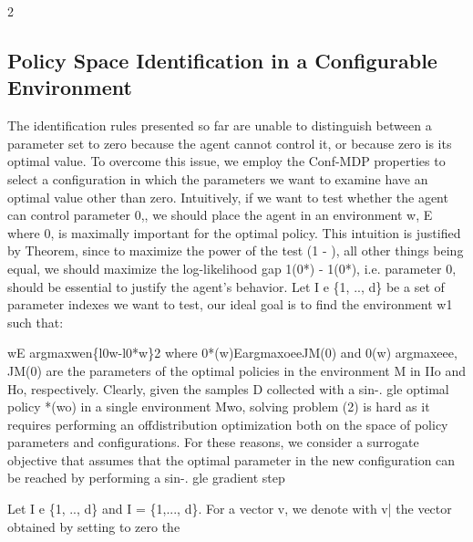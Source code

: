 \documentclass{article}
\begin{document}
\begin{paracol}{2}
\subsection*{Policy Space Identification in a Configurable
Environment}


The identification rules presented so far are unable to distinguish between a parameter set to zero because the agent
cannot control it, or because zero is its optimal value. To
overcome this issue, we employ the Conf-MDP properties
to select a configuration in which the parameters we want to
examine have an optimal value other than zero. Intuitively, if
we want to test whether the agent can control parameter 0,,
we should place the agent in an environment w, E  where
0, is maximally important for the optimal policy. This intuition is justified by Theorem, since to maximize the power
of the test (1 - ), all other things being equal, we should
maximize the log-likelihood gap 1(0*) - 1(0*), i.e. parameter 0, should be essential to justify the agent's behavior. Let
I e \{1, .., d\} be a set of parameter indexes we want to test,
our ideal goal is to find the environment w1 such that:


wE argmaxwen\{l0w-l0*w\}2
where 0*(w)EargmaxoeeJM(0) and 0(w) 
argmaxeee, JM(0) are the parameters of the optimal
policies in the environment M in IIo and Ho, respectively. Clearly, given the samples D collected with a sin-.
gle optimal policy *(wo) in a single environment Mwo,
solving problem (2) is hard as it requires performing an offdistribution optimization both on the space of policy parameters and configurations. For these reasons, we consider a
surrogate objective that assumes that the optimal parameter
in the new configuration can be reached by performing a sin-.
gle gradient step


Let I e \{1, .., d\} and I = \{1,..., d\}\I. For a vector v, we
denote with v| the vector obtained by setting to zero the

\end{paracol}
\end{document}
